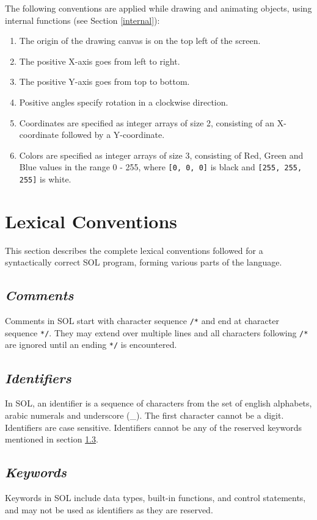 \documentclass[letterpaper,12pt]{article}
\begin{document}
    The following conventions are applied while drawing and animating objects, using internal functions (see Section \ref{internal}):

	\begin{enumerate}
		\itemsep0em
		\item The origin of the drawing canvas is on the top left of the screen.
		\item The positive X-axis goes from left to right.
		\item The positive Y-axis goes from top to bottom.
		\item Positive angles specify rotation in a clockwise direction.
		\item Coordinates are specified as integer arrays of size 2, consisting of an X-coordinate followed by a Y-coordinate.
		\item Colors are specified as integer arrays of size 3, consisting of Red, Green and Blue values in the range 0 - 255, where \texttt{[0, 0, 0]} is black and \texttt{[255, 255, 255]} is white.
	\end{enumerate}

\section{Lexical Conventions}

This section describes the complete lexical conventions followed for a syntactically correct SOL program, forming various parts of the language.

    \subsection{\textit{Comments}}
    Comments in SOL start with character sequence \texttt{/*} and end at character sequence \texttt{*/}. They may extend over multiple lines and all characters following \texttt{/*} are ignored until an ending \texttt{*/} is encountered.

    \subsection{\textit{Identifiers}}
    In SOL, an identifier is a sequence of characters from the set of english alphabets, arabic numerals and underscore (\_). The first character cannot be a digit. Identifiers are case sensitive. Identifiers cannot be any of the reserved keywords mentioned in section \ref{keywords}.

    \subsection{\textit{Keywords}} \label{keywords}
    Keywords in SOL include data types, built-in functions, and control statements, and may not be used as identifiers as they are reserved.
\end{document}
